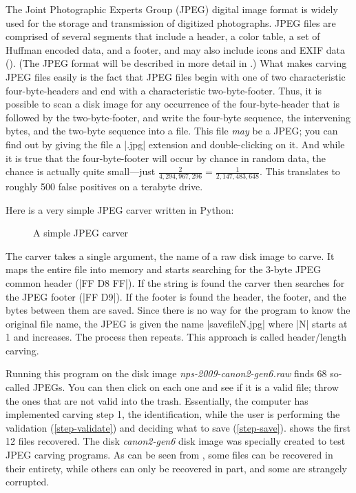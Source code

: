 \documentclass[11pt,letter]{article}
\begin{document}
The Joint Photographic Experts Group (JPEG) digital image format is
widely used for the storage and transmission of digitized
photographs. JPEG files are comprised of several segments that include
a header, a color table, a set of Huffman encoded data, and a footer,
and may also include icons and EXIF data
(). (The JPEG format will be described in
more detail in .) What makes carving JPEG files
easily is the fact that JPEG files begin with one of two
characteristic four-byte-headers and end with a characteristic
two-byte-footer. Thus, it is possible to scan a disk image for any
occurrence of the four-byte-header that is followed by the
two-byte-footer, and write the four-byte sequence, the intervening
bytes, and the two-byte sequence into a file. This file \emph{may} be
a JPEG; you can find out by giving the file a |.jpg| extension and
double-clicking on it. And while it is true that the four-byte-footer
will occur by chance in random data, the chance is actually quite
small---just $\frac{2}{4,294,967,296}=\frac{1}{2,147,483,648}$. This
translates to roughly 500 false positives on a terabyte drive.

Here is a very simple JPEG carver written in Python:

\begin{figure}
{\small
\lstset{language=python}

}
\caption{A simple JPEG carver}\label{jpeg-carver}
\end{figure}

The carver takes a single argument, the name of a raw disk image to
carve. It maps the entire file into memory and starts searching for
the  3-byte JPEG common header (|FF D8 FF|). If the string is found the carver then searches
for the JPEG footer (|FF D9|). If the footer is found the header, the
footer, and the bytes between them are saved. Since there is no way
for the program to know the original file name, the JPEG is given the
name |savefileN.jpg| where |N| starts at 1 and increases. The process
then repeats. This approach is called header/length carving.

Running this program on the disk image \emph{nps-2009-canon2-gen6.raw}
finds 68 so-called JPEGs. You can then click on each one and see if it
is a valid file; throw the ones that are not valid into the
trash. Essentially, the computer has implemented carving step 1, the
identification, while the user is performing the validation
(\ref{step-validate}) and deciding what to save
(\ref{step-save}).  shows the first 12
files recovered. The disk \emph{canon2-gen6} disk image was specially
created to test JPEG carving programs. As can be seen from
, some files can be recovered in
their entirety, while others can only be recovered in part, and some
are strangely corrupted.
\end{document}
